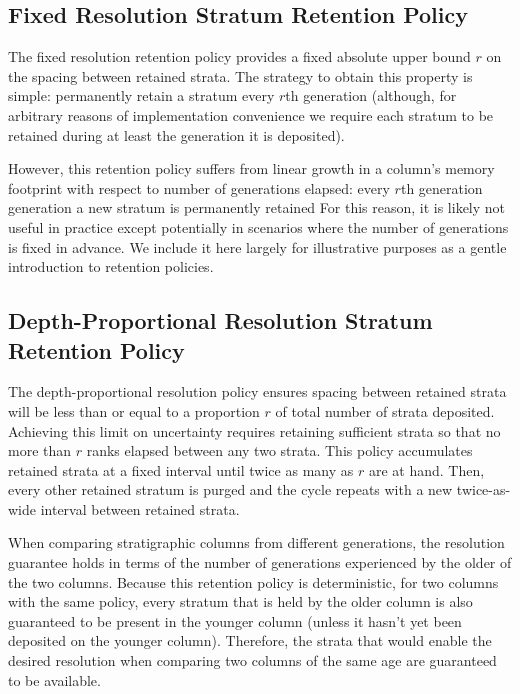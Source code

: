 

\subsection{Fixed Resolution Stratum Retention Policy}

The fixed resolution retention policy provides a fixed absolute upper bound $r$ on the spacing between retained strata.
The strategy to obtain this property is simple: permanently retain a stratum every $r$th generation
(although, for arbitrary reasons of implementation convenience we require each stratum to be retained during at least the generation it is deposited).

However, this retention policy suffers from linear growth in a column's memory footprint with respect to number of generations elapsed: every $r$th generation generation a new stratum is permanently retained
For this reason, it is likely not useful in practice except potentially in scenarios where the number of generations is fixed in advance.
We include it here largely for illustrative purposes as a gentle introduction to retention policies.

\subsection{Depth-Proportional Resolution Stratum Retention Policy}

The depth-proportional resolution policy ensures spacing between retained strata will be less than or equal to a proportion $r$ of total number of strata deposited.
Achieving this limit on uncertainty requires retaining sufficient strata so that no more than $r$ ranks elapsed between any two strata.
This policy accumulates retained strata at a fixed interval until twice as many as $r$ are at hand.
Then, every other retained stratum is purged and the cycle repeats with a new twice-as-wide interval between retained strata.

When comparing stratigraphic columns from different generations, the resolution guarantee holds in terms of the number of generations experienced by the older of the two columns.
Because this retention policy is deterministic, for two columns with the same policy, every stratum that is held by the older column is also guaranteed to be present in the younger column (unless it hasn't yet been deposited on the younger column).
Therefore, the strata that would enable the desired resolution when comparing two columns of the same age are guaranteed to be available.


